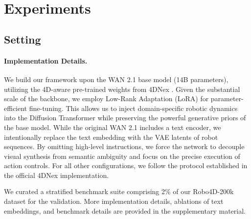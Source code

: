 \section{Experiments}

\subsection{Setting}
\paragraph{Implementation Details.}
We build our framework upon the WAN 2.1 \cite{wan2025wan} base model (14B parameters), utilizing the 4D-aware pre-trained weights from 4DNex \cite{chen20254dnex}. Given the substantial scale of the backbone, we employ Low-Rank Adaptation (LoRA) \cite{hu2022lora} for parameter-efficient fine-tuning. This allows us to inject domain-specific robotic dynamics into the Diffusion Transformer \cite{dit} while preserving the powerful generative priors of the base model.
While the original WAN 2.1 includes a text encoder, we intentionally replace the text embedding with the VAE latents of robot sequences. By omitting high-level instructions, we force the network to decouple visual synthesis from semantic ambiguity and focus on the precise execution of action controls. For all other configurations, we follow the protocol established in the official 4DNex implementation.

We curated a stratified benchmark suite comprising 2\% of our Robo4D-200k dataset for the validation. More implementation details, ablations of text embeddings, and benchmark details are provided in the supplementary material.


